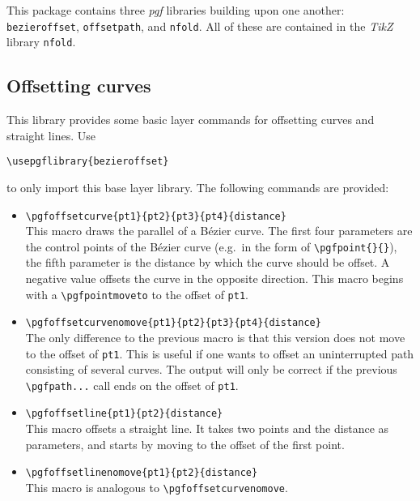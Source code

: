\documentclass[12pt,a4paper]{article}
\theoremstyle{definition}
\newcommand{\nfold}{\texttt{nfold}}
\begin{document}
This package contains three \emph{pgf} libraries building upon one another: \texttt{bezieroffset}, \texttt{offsetpath}, and \nfold. All of these are contained in the \emph{TikZ} library \nfold. 

\subsection{Offsetting curves}
This library provides some basic layer commands for offsetting curves and straight lines. Use
\begin{verbatim}
\usepgflibrary{bezieroffset}
\end{verbatim}
to only import this base layer library. The following commands are provided:
\begin{itemize}
  \item \verb|\pgfoffsetcurve{pt1}{pt2}{pt3}{pt4}{distance}|\\%
    This macro draws the parallel of a Bézier curve. The first four parameters are the control points of the Bézier curve (e.g.\ in the form of \verb|\pgfpoint{}{}|), the fifth parameter is the distance by which the curve should be offset. A negative value offsets the curve in the opposite direction. This macro begins with a \verb|\pgfpointmoveto| to the offset of \texttt{pt1}.
  \item \verb|\pgfoffsetcurvenomove{pt1}{pt2}{pt3}{pt4}{distance}|\\%
    The only difference to the previous macro is that this version does not move to the offset of \texttt{pt1}. This is useful if one wants to offset an uninterrupted path consisting of several curves. The output will only be correct if the previous \verb|\pgfpath...| call ends on the offset of \texttt{pt1}.
  \item \verb|\pgfoffsetline{pt1}{pt2}{distance}|\\%
    This macro offsets a straight line. It takes two points and the distance as parameters, and starts by moving to the offset of the first point.
  \item \verb|\pgfoffsetlinenomove{pt1}{pt2}{distance}|\\%
    This macro is analogous to \verb|\pgfoffsetcurvenomove|.
\end{itemize}
\end{document}
